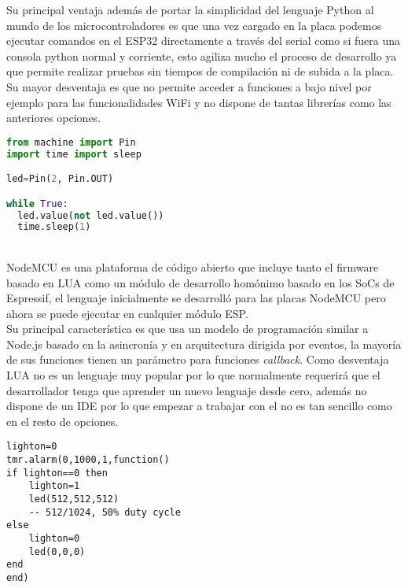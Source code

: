 \documentclass[../proyecto.tex]{subfiles}
\begin{document}
Su principal ventaja además de portar la simplicidad del lenguaje Python al mundo de los microcontroladores es que una vez cargado en la placa podemos ejecutar comandos en el ESP32 directamente a través del serial como si fuera una consola python normal y corriente, esto agiliza mucho el proceso de desarrollo ya que permite realizar pruebas sin tiempos de compilación ni de subida a la placa. Su mayor desventaja es que no permite acceder  a funciones a bajo nivel por ejemplo para las funcionalidades WiFi y no dispone de tantas librerías como las anteriores opciones.\\

\begin{minipage}{\linewidth}
\begin{lstlisting}[language=Python, caption=Ejemplo de código para hacer parpadear un led con MicroPython, captionpos=b, frame=single]
from machine import Pin
import time import sleep

led=Pin(2, Pin.OUT)

while True:
  led.value(not led.value())
  time.sleep(1)
\end{lstlisting}
\end{minipage}

\\
NodeMCU es una plataforma de código abierto que incluye tanto el firmware basado en LUA como un módulo de desarrollo homónimo basado en los SoCs de Espressif, el lenguaje inicialmente se desarrolló para las placas NodeMCU pero ahora se puede ejecutar en cualquier módulo ESP.\\

Su principal característica es que usa un modelo de programación similar a Node.js basado en la  asincronía  y en arquitectura dirigida por eventos, la mayoría de sus funciones tienen un parámetro para funciones \textit{callback}. Como desventaja LUA no es un lenguaje muy popular por lo que normalmente requerirá que el desarrollador tenga que aprender un nuevo lenguaje desde cero, además no dispone de un IDE por lo que empezar a trabajar con el no es tan sencillo como en el resto de opciones.\\

\begin{minipage}{\linewidth}
\begin{lstlisting}[language={[5.0]Lua}, caption=Ejemplo de código para hacer parpadear un led con NodeMCU, captionpos=b, frame=single]
lighton=0
tmr.alarm(0,1000,1,function()
if lighton==0 then
    lighton=1
    led(512,512,512)
    -- 512/1024, 50% duty cycle
else
    lighton=0
    led(0,0,0)
end
end)
\end{lstlisting}
\end{minipage}
\end{document}

